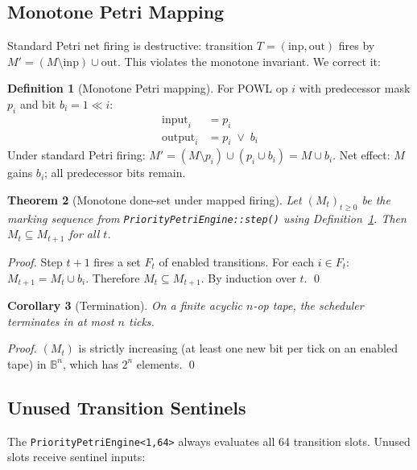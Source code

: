\documentclass[12pt,a4paper]{article}
\newtheorem{theorem}{Theorem}[section]
\newtheorem{corollary}[theorem]{Corollary}
\theoremstyle{definition}
\newtheorem{definition}[theorem]{Definition}
\theoremstyle{remark}
\newcommand{\B}{\mathbb{B}}
\begin{document}
\subsection{Monotone Petri Mapping}

Standard Petri net firing is destructive: transition $T = (\mathrm{inp}, \mathrm{out})$
fires by $M' = (M \setminus \mathrm{inp}) \cup \mathrm{out}$.
This violates the monotone invariant.
We correct it:

\begin{definition}[Monotone Petri mapping]
\label{def:monopetri}
For POWL op $i$ with predecessor mask $p_i$ and bit $b_i = 1 \ll i$:
\begin{align*}
  \mathrm{input}_i  &= p_i \\
  \mathrm{output}_i &= p_i \;\vee\; b_i
\end{align*}
Under standard Petri firing:
$M' = (M \setminus p_i) \cup (p_i \cup b_i) = M \cup b_i$.
Net effect: $M$ gains $b_i$; all predecessor bits remain.
\end{definition}

\begin{theorem}[Monotone done-set under mapped firing]
\label{thm:monotonedone}
Let $(M_t)_{t \geq 0}$ be the marking sequence from
\texttt{PriorityPetriEngine::step()} using Definition~\ref{def:monopetri}.
Then $M_t \subseteq M_{t+1}$ for all $t$.
\end{theorem}
\begin{proof}
Step $t+1$ fires a set $F_t$ of enabled transitions.
For each $i \in F_t$: $M_{t+1} = M_t \cup b_i$.
Therefore $M_t \subseteq M_{t+1}$.
By induction over $t$. \qed
\end{proof}

\begin{corollary}[Termination]
On a finite acyclic $n$-op tape, the scheduler terminates in at most $n$ ticks.
\end{corollary}
\begin{proof}
$(M_t)$ is strictly increasing (at least one new bit per tick on an enabled tape)
in $\B^n$, which has $2^n$ elements. \qed
\end{proof}

\subsection{Unused Transition Sentinels}

The \texttt{PriorityPetriEngine<1,64>} always evaluates all 64 transition slots.
Unused slots receive sentinel inputs:
\end{document}
